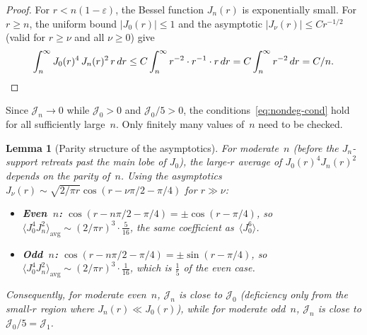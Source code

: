 \documentclass[12pt]{article}
\newtheorem{lemma}[theorem]{Lemma}
\theoremstyle{definition}
\theoremstyle{remark}
\begin{document}
\begin{proof}
  For $r<n(1-\varepsilon)$, the Bessel function $J_n(r)$ is exponentially
  small.  For $r\geq n$, the uniform bound $|J_0(r)|\leq 1$ and the
  asymptotic $|J_\nu(r)|\leq Cr^{-1/2}$ (valid for $r\geq\nu$ and all
  $\nu\geq 0$) give
  \[
    \int_n^\infty J_0(r)^4\,J_n(r)^2\,r\,dr
    \leq C\int_n^\infty r^{-2}\cdot r^{-1}\cdot r\,dr
    = C\int_n^\infty r^{-2}\,dr = C/n.  \qedhere
  \]
\end{proof}

Since $\mathcal J_n\to 0$ while $\mathcal J_0>0$ and
$\mathcal J_0/5>0$, the conditions~\eqref{eq:nondeg-cond} hold for all
sufficiently large~$n$.  Only finitely many values of~$n$ need to be
checked.

\begin{lemma}[Parity structure of the asymptotics]
  \label{lem:parity}
  For moderate~$n$ (before the $J_n$-support retreats past the main
  lobe of $J_0$), the large-$r$ average of $J_0(r)^4J_n(r)^2$ depends
  on the parity of~$n$.  Using the asymptotics
  $J_\nu(r)\sim\sqrt{2/\pi r}\cos(r-\nu\pi/2-\pi/4)$ for $r\gg\nu$:
  \begin{itemize}
    \item \textbf{Even~$n$:}
      $\cos(r-n\pi/2-\pi/4)=\pm\cos(r-\pi/4)$, so
      $\langle J_0^4J_n^2\rangle_{\mathrm{avg}}
      \sim(2/\pi r)^3\cdot\tfrac{5}{16}$,
      the same coefficient as~$\langle J_0^6\rangle$.
    \item \textbf{Odd~$n$:}
      $\cos(r-n\pi/2-\pi/4)=\pm\sin(r-\pi/4)$, so
      $\langle J_0^4J_n^2\rangle_{\mathrm{avg}}
      \sim(2/\pi r)^3\cdot\tfrac{1}{16}$,
      which is $\tfrac{1}{5}$ of the even case.
  \end{itemize}
  Consequently, for moderate even~$n$, $\mathcal J_n$ is close to
  $\mathcal J_0$ (deficiency only from the small-$r$ region where
  $J_n(r)\ll J_0(r)$), while for moderate odd~$n$, $\mathcal J_n$ is
  close to $\mathcal J_0/5=\mathcal J_1$.
\end{lemma}
\end{document}
